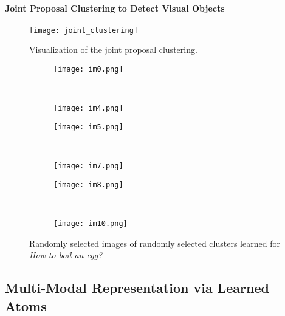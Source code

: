 \paragraph{Joint Proposal Clustering to Detect Visual Objects}
\begin{figure}[ht]
  \texttt{[image: joint\_clustering]}
  \caption{Visualization of the joint proposal clustering.}
\end{figure}
\begin{figure}[ht]
  \begin{subfigure}[b]{0.23\textwidth}
\texttt{[image: im0.png]}
\end{subfigure}
~
\begin{subfigure}[b]{0.23\textwidth}
\texttt{[image: im4.png]}
\end{subfigure}
\begin{subfigure}[b]{0.23\textwidth}
\texttt{[image: im5.png]}
\end{subfigure}
~
\begin{subfigure}[b]{0.23\textwidth}
\texttt{[image: im7.png]}
\end{subfigure}

\begin{subfigure}[b]{0.23\textwidth}
\texttt{[image: im8.png]}
\end{subfigure}
~
\begin{subfigure}[b]{0.23\textwidth}
\texttt{[image: im10.png]}
\end{subfigure}
\caption{Randomly selected images of randomly selected clusters learned for \emph{How to boil an egg?}}
\end{figure}
\subsection{Multi-Modal Representation via Learned Atoms}
